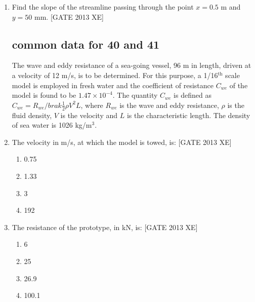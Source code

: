\documentclass[journal,12pt,onecolumn]{IEEEtran}
\theoremstyle{remark}
\begin{document}
\begin{enumerate}
\item Find the slope of the streamline passing through the point $x=0.5$ m and $y=50$ mm\underline{\hspace{1.5cm}}. \hfill[GATE 2013 XE]

\subsection{common data for 40 and 41}
The wave and eddy resistance of a sea-going vessel, 96 m in length, driven at a velocity of 12 m/s, is to be determined. For this purpose, a 1/16$^\text{th}$ scale model is employed in fresh water and the coefficient of resistance $C_{we}$ of the model is found to be $1.47 \times 10^{-4}$. The quantity $C_{we}$ is defined as $C_{we} = R_{we} / brak{\frac{1}{2} \rho V^2 L}$, where $R_{we}$ is the wave and eddy resistance, $\rho$ is the fluid density, $V$ is the velocity and $L$ is the characteristic length. The density of sea water is 1026 kg/m$^3$.
\item The velocity in m/s, at which the model is towed, is: \hfill[GATE 2013 XE]

\begin{multicols}{4}
\begin{enumerate}
\item 0.75
\item 1.33
\item 3
\item 192
\end{enumerate}
\end{multicols}

\item The resistance of the prototype, in kN, is: \hfill[GATE 2013 XE]

\begin{multicols}{4}
\begin{enumerate}
\item 6
\item 25
\item 26.9
\item 100.1
\end{enumerate}
\end{multicols}

\end{enumerate}
\end{document}
